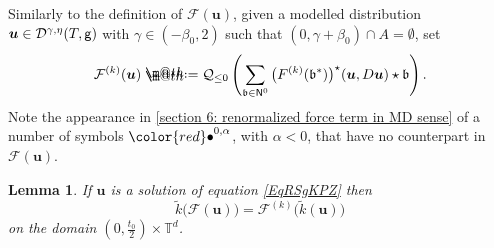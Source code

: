 \documentclass[10pt, reqno]{amsart}
\makeatletter
\numberwithin{subsection}{section}
\numberwithin{subsubsection}{subsection}
\numberwithin{equation}{section} %
\theoremstyle{mystyle}
\newtheorem{lem}[thm]{\hspace{-0.14cm}  {Lemma} }%
\theoremstyle{mystyle2}
\theoremstyle{mystyle3}
\newcommand{\mcF}{\boldsymbol{p}}
\newcommand{\bsu}{\boldsymbol{u}}
\newcommand{\bbT}{\mathbb{T}}
\newcommand{\mcD}{\mathcal{D}}
\renewcommand{\mcF}{\mathcal{F}}
\newcommand*{\defeq}{\mathrel{\rlap{%
                     \raisebox{0.3ex}{$\m@th\cdot$}}%
                     \raisebox{-0.3ex}{$\m@th\cdot$}}%
                     =}
\makeatother
\begin{document}
\medskip

Similarly to the definition of $\mcF(\bsu)$, given a modelled distribution $\bsu\in\mcD^{\gamma,\eta}(T,\sf g)$ with $\gamma\in(-\beta_0,2)$ such that $(0,\gamma+\beta_0)\cap A=\emptyset$, set
\begin{align}\label{section 6: renormalized force term in MD sense}
\mcF^{(k)}(\bsu) \defeq  \mathcal{Q}_{\le 0}\left(\sum_{\frak{b}\in{\sf N}^0}\big(F^{(k)}(\frak{b}^*)\big)^\star(\bsu, D\bsu  )\star\frak{b}\right).
\end{align}
Note the appearance in \eqref{section 6: renormalized force term in MD sense} of a number of symbols ${\color{red} \bullet}^{0,\alpha}$, with $\alpha<0$, that have no counterpart in $\mcF(\bsu)$.

\medskip

\begin{lem}\label{lem kF=Fk}
If $\bsu$ is a solution of equation \eqref{EqRSgKPZ} then
\begin{equation} \label{EqIdentityTildeKUpsilon}
\widetilde{k}\big(\mcF(\bsu)\big) = \mcF^{(k)}\big(\widetilde{k}(\bsu)\big)
\end{equation}
on the domain $(0,\frac{t_0}2)\times\bbT^d$.
\end{lem}

\medskip
\end{document}
